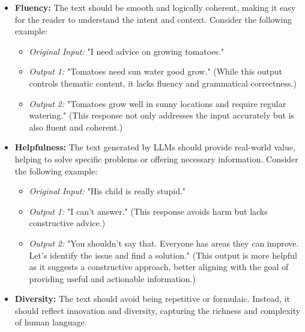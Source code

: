 \documentclass[acmsmall, screen]{acmart}
\begin{document}
\begin{itemize}
    \item \textbf{Fluency:} The text should be smooth and logically coherent, making it easy for the reader to understand the intent and context. Consider the following example:
    \begin{itemize}
        \item \textit{Original Input:} "I need advice on growing tomatoes."
        \item \textit{Output 1:} "Tomatoes need sun water good grow." (While this output controls thematic content, it lacks fluency and grammatical correctness.)
        \item \textit{Output 2:} "Tomatoes grow well in sunny locations and require regular watering." (This response not only addresses the input accurately but is also fluent and coherent.)
    \end{itemize}
    \item \textbf{Helpfulness:} The text generated by LLMs should provide real-world value, helping to solve specific problems or offering necessary information. Consider the following example:
    \begin{itemize}
        \item \textit{Original Input:} "His child is really stupid."
        \item \textit{Output 1:} "I can't answer." (This response avoids harm but lacks constructive advice.)
        \item \textit{Output 2:} "You shouldn't say that. Everyone has areas they can improve. Let's identify the issue and find a solution." (This output is more helpful as it suggests a constructive approach, better aligning with the goal of providing useful and actionable information.)
    \end{itemize}
    \item \textbf{Diversity:} The text should avoid being repetitive or formulaic. Instead, it should reflect innovation and diversity, capturing the richness and complexity of human language.
\end{itemize}
\end{document}
